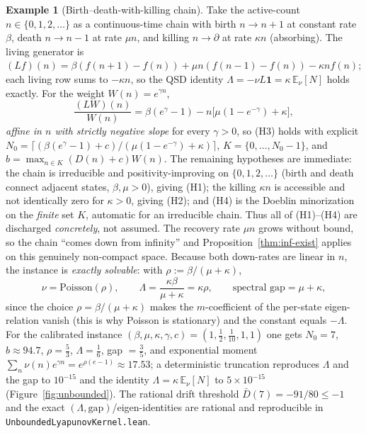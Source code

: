 \documentclass[11pt,reqno]{amsart}
\theoremstyle{plain}
\theoremstyle{definition}
\newtheorem{example}[theorem]{Example}
\theoremstyle{remark}
\begin{document}
\begin{example}[Birth--death-with-killing chain]\label{ex:unbounded}
Take the active-count $n\in\{0,1,2,\dots\}$ as a continuous-time chain with birth
$n\to n+1$ at constant rate $\beta$, death $n\to n-1$ at rate $\mu n$, and killing
$n\to\partial$ at rate $\kappa n$ (absorbing). The living generator is
$(Lf)(n)=\beta(f(n+1)-f(n))+\mu n(f(n-1)-f(n))-\kappa n f(n)$; each living row sums to
$-\kappa n$, so the QSD identity $\Lambda=-\nu L\mathbf 1=\kappa\,\mathbb E_\nu[N]$
holds exactly. For the weight $W(n)=e^{\gamma n}$,
\[
\frac{(LW)(n)}{W(n)}=\beta(e^{\gamma}-1)-n\bigl[\mu(1-e^{-\gamma})+\kappa\bigr],
\]
\emph{affine in $n$ with strictly negative slope} for every $\gamma>0$, so (H3) holds
with explicit $N_0=\lceil(\beta(e^\gamma-1)+c)/(\mu(1-e^{-\gamma})+\kappa)\rceil$,
$K=\{0,\dots,N_0-1\}$, and $b=\max_{n\in K}(D(n)+c)W(n)$. The remaining hypotheses are
immediate: the chain is irreducible and positivity-improving on $\{0,1,2,\dots\}$ (birth
and death connect adjacent states, $\beta,\mu>0$), giving (H1); the killing $\kappa n$
is accessible and not identically zero for $\kappa>0$, giving (H2); and (H4) is the
Doeblin minorization on the \emph{finite} set $K$, automatic for an irreducible chain.
Thus all of (H1)--(H4) are discharged \emph{concretely}, not assumed. The recovery rate
$\mu n$ grows without bound, so the chain ``comes down from infinity'' and
Proposition~\ref{thm:inf-exist} applies on this genuinely non-compact space. Because both
down-rates are linear in $n$, the instance is \emph{exactly solvable}: with
$\rho:=\beta/(\mu+\kappa)$,
\[
\nu=\mathrm{Poisson}(\rho),\qquad
\Lambda=\frac{\kappa\beta}{\mu+\kappa}=\kappa\rho,\qquad
\text{spectral gap}=\mu+\kappa,
\]
since the choice $\rho=\beta/(\mu+\kappa)$ makes the $m$-coefficient of the per-state
eigen-relation vanish (this is why Poisson is stationary) and the constant equals
$-\Lambda$. For the calibrated instance $(\beta,\mu,\kappa,\gamma,c)=(1,\tfrac12,
\tfrac1{10},1,1)$ one gets $N_0=7$, $b\approx94.7$, $\rho=\tfrac53$,
$\Lambda=\tfrac16$, gap $=\tfrac35$, and exponential moment $\sum_n\nu(n)e^{\gamma
n}=e^{\rho(e-1)}\approx17.53$; a deterministic truncation reproduces $\Lambda$ and
the gap to $10^{-15}$ and the identity $\Lambda=\kappa\,\mathbb E_\nu[N]$ to
$5\times10^{-15}$ (Figure~\ref{fig:unbounded}). The rational drift threshold
$\bar D(7)=-91/80\le-1$ and the exact $(\Lambda,\text{gap})$/eigen-identities are
rational and reproducible in \texttt{UnboundedLyapunovKernel.lean}.
\end{example}
\end{document}
